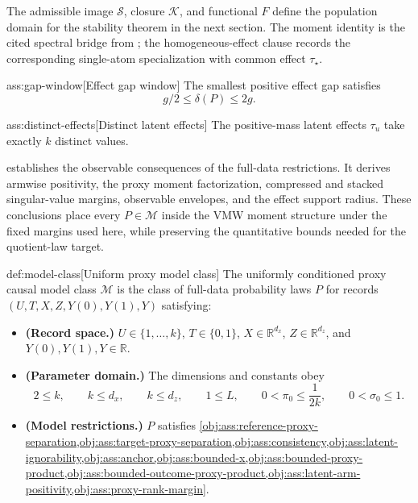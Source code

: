 The admissible image \(\mathscr S\), closure \(\mathcal K\), and functional \(F\) define the population domain for the stability theorem in the next section. The moment identity is the cited spectral bridge from \citet{VirkMazaheriWu2026}; the homogeneous-effect clause records the corresponding single-atom specialization with common effect \(\tau_\star\).

\begin{assumptionv}{ass:gap-window}[Effect gap window]
The smallest positive effect gap satisfies
\[
g/2\le \delta(P)\le 2g .
\]
\end{assumptionv}

\begin{assumptionv}{ass:distinct-effects}[Distinct latent effects]
The positive-mass latent effects \(\tau_u\) take exactly \(k\) distinct values.
\end{assumptionv}

 establishes the observable consequences of the full-data restrictions. It derives armwise positivity, the proxy moment factorization, compressed and stacked singular-value margins, observable envelopes, and the effect support radius. These conclusions place every \(P\in\mathcal M\) inside the VMW moment structure under the fixed margins used here, while preserving the quantitative bounds needed for the quotient-law target.



\begin{definitionv}{def:model-class}[Uniform proxy model class]
The uniformly conditioned proxy causal model class \(\mathcal M\) is the class of full-data probability laws \(P\) for records \((U,T,X,Z,Y(0),Y(1),Y)\) satisfying:
\begin{itemize}
\item \textbf{(Record space.)} \(U\in\{1,\ldots,k\}\), \(T\in\{0,1\}\), \(X\in\mathbb R^{d_x}\), \(Z\in\mathbb R^{d_z}\), and \(Y(0),Y(1),Y\in\mathbb R\).
\item \textbf{(Parameter domain.)} The dimensions and constants obey
\[
2\le k,\qquad k\le d_x,\qquad k\le d_z,\qquad 1\le L,\qquad 0<\pi_0\le \frac{1}{2k},\qquad 0<\sigma_0\le 1.
\]
\item \textbf{(Model restrictions.)} \(P\) satisfies \cref{obj:ass:reference-proxy-separation,obj:ass:target-proxy-separation,obj:ass:consistency,obj:ass:latent-ignorability,obj:ass:anchor,obj:ass:bounded-x,obj:ass:bounded-proxy-product,obj:ass:bounded-outcome-proxy-product,obj:ass:latent-arm-positivity,obj:ass:proxy-rank-margin}.
\end{itemize}
\end{definitionv}

